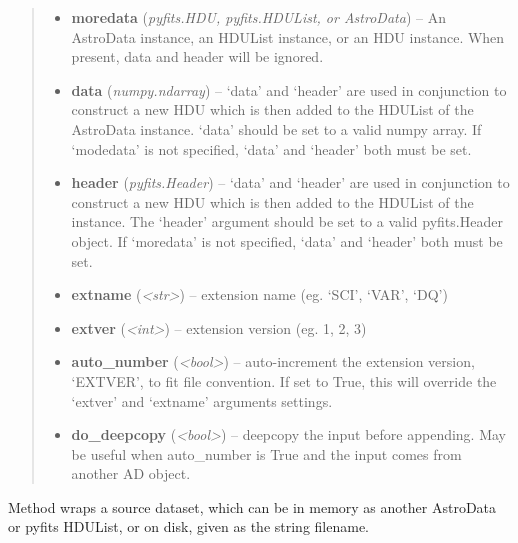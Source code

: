 \documentclass[letterpaper,10pt,english]{sphinxmanual}
\begin{document}
\begin{fulllineitems}
\begin{fulllineitems}
\begin{quote}
\begin{description}
\begin{itemize}
\item {} 
\textbf{moredata} (\emph{pyfits.HDU, pyfits.HDUList, or AstroData}) -- An AstroData instance, an HDUList instance, or
an HDU instance. When present, data and header will be
ignored.

\item {} 
\textbf{data} (\emph{numpy.ndarray}) -- `data' and `header' are used in conjunction to construct a
new HDU which is then added to the HDUList of the AstroData
instance. `data' should be set to a valid numpy array. 
If `modedata' is not specified, `data' and `header' both
must be set.

\item {} 
\textbf{header} (\emph{pyfits.Header}) -- `data' and `header' are used in conjunction to construct
a new HDU which is then added to the HDUList of the
instance. The `header' argument should be set to a valid
pyfits.Header object. If `moredata' is not specified,
`data' and `header' both must be set.

\item {} 
\textbf{extname} (\emph{\textless{}str\textgreater{}}) -- extension name (eg. `SCI', `VAR', `DQ')

\item {} 
\textbf{extver} (\emph{\textless{}int\textgreater{}}) -- extension version (eg. 1, 2, 3)

\item {} 
\textbf{auto\_number} (\emph{\textless{}bool\textgreater{}}) -- auto-increment the extension version, `EXTVER',
to fit file convention. If set to True, this will
override the `extver' and `extname' arguments
settings.

\item {} 
\textbf{do\_deepcopy} (\emph{\textless{}bool\textgreater{}}) -- deepcopy the input before appending. May be useful
when auto\_number is True and the input comes from
another AD object.

\end{itemize}

\end{description}\end{quote}

\end{fulllineitems}


\begin{fulllineitems}
\label{astro_class:astrodata.AstroData.open}
Method wraps a source dataset, which can be in memory as another
AstroData or pyfits HDUList, or on disk, given as the string filename.


\end{fulllineitems}
\end{fulllineitems}
\end{document}
